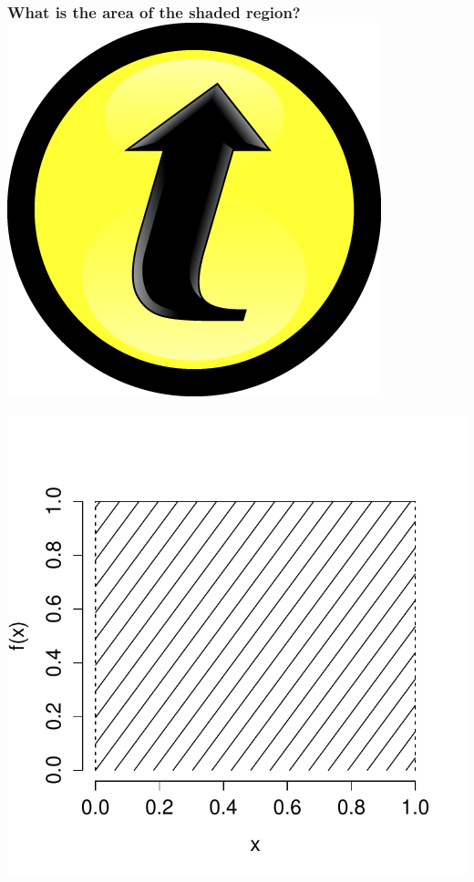\documentclass[handout]{beamer}
\begin{document}
\begin{frame}
\frametitle{What is the area of the shaded region? \hfill \includegraphics[scale = 0.05]{./images/clicker}}

\centering
	\includegraphics[scale = 0.6]{./images/uniform_density_shaded}

\end{frame}
\end{document}
